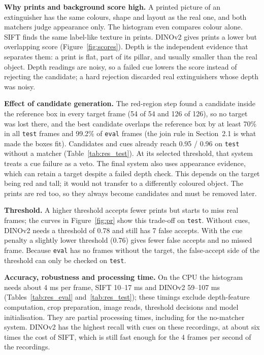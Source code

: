 \documentclass[11pt,a4paper]{article}
\begin{document}
\textbf{Why prints and background score high.} A printed picture of an extinguisher has the same colours, shape and layout as the real one, and both matchers judge appearance only. The histogram even compares colour alone.
SIFT finds the same label-like texture in prints. DINOv2 gives prints a lower but overlapping score (Figure~\ref{fig:scores}).
Depth is the independent evidence that separates them: a print is flat, part of its pillar, and usually smaller than the real object. Depth readings are noisy, so a failed cue lowers the score instead of rejecting the candidate; a hard rejection discarded real extinguishers whose depth was noisy.

\textbf{Effect of candidate generation.} The red-region step found a candidate inside the reference box in every target frame (54 of 54 and 126 of 126), so no target was lost there, and the best candidate overlaps the reference box by at least 70\% in all \texttt{test} frames and 99.2\% of \texttt{eval} frames (the join rule in Section~2.1 is what made the boxes fit).
Candidates and cues already reach 0.95 / 0.96 on \texttt{test} without a matcher (Table~\ref{tab:res_test}). At its selected threshold, that system treats a cue failure as a veto. The final system also uses appearance evidence, which can retain a target despite a failed depth check.
This depends on the target being red and tall; it would not transfer to a differently coloured object. The prints are red too, so they always become candidates and must be removed later.

\textbf{Threshold.} A higher threshold accepts fewer prints but starts to miss real frames; the curves in Figure~\ref{fig:pr} show this trade-off on \texttt{test}.
Without cues, DINOv2 needs a threshold of 0.78 and still has 7 false accepts. With the cue penalty a slightly lower threshold (0.76) gives fewer false accepts and no missed frame. Because \texttt{eval} has no frames without the target, the false-accept side of the threshold can only be checked on \texttt{test}.

\textbf{Accuracy, robustness and processing time.} On the CPU the histogram needs about 4 ms per frame, SIFT 10--17 ms and DINOv2 59--107 ms (Tables~\ref{tab:res_eval} and~\ref{tab:res_test}); these timings exclude depth-feature computation, crop preparation, image reads, threshold decisions and model initialisation. They are partial processing times, including for the no-matcher system. DINOv2 has the highest recall with cues on these recordings, at about six times the cost of SIFT, which is still fast enough for the 4 frames per second of the recordings.
\end{document}
